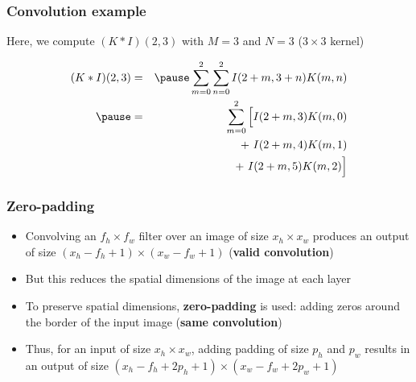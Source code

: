 \documentclass[smaller]{beamer}
\begin{document}
\begin{frame}
  \frametitle{Convolution example}
  \pause
  Here, we compute $(K*I)(2,3)$ with $M = 3$ and $N = 3$ ($3\times 3$ kernel) \pause
  
    \pause
    \begin{eqnarray*}\small
      (K*I)(2,3) &=& \pause \sum_{m=0}^{2}\sum_{n=0}^{2}I(2+m, 3+n)K(m,n) \\\pause
                 &=& \sum_{m=0}^{2}\Big[I(2+m, 3)K(m,0)\\
                 && \quad\quad + ~ I(2+m, 4)K(m,1) \\
                 && \quad\qquad + ~ I(2+m, 5)K(m,2)\Big]
    \end{eqnarray*}
\end{frame}

\begin{frame}
  \frametitle{Zero-padding}\pause
\begin{itemize}
  \item Convolving an $f_h \times f_w$ filter over an image of size $x_h \times x_w$ produces an output of size $(x_h -f_h + 1)\times (x_w - f_w +1)$ (\textbf{valid convolution})\pause
  \item But this reduces the spatial dimensions of the image at each layer\pause
  \item To preserve spatial dimensions, \textbf{zero-padding} is used: adding zeros around the border of the input image (\textbf{same convolution})\pause
  \item Thus, for an input of size $x_h \times x_w$, adding padding of size $p_h$ and $p_w$ results in an output of size $(x_h - f_h + 2p_h + 1)\times (x_w - f_w + 2p_w + 1)$\pause
\end{itemize}
  

\end{frame}
\end{document}
